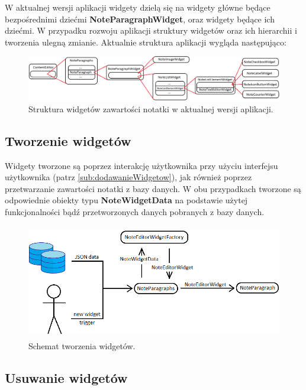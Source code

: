 W aktualnej wersji aplikacji widgety dzielą się na widgety główne będące bezpośrednimi dziećmi \textbf{NoteParagraphWidget}, oraz widgety będące ich dziećmi. W przypadku rozwoju aplikacji struktury widgetów oraz ich hierarchii i tworzenia ulegną zmianie. Aktualnie struktura aplikacji wygląda następująco:

\begin{figure}[ht]
    \centering
    \includegraphics[width=\linewidth]{images/struktura_widgetow_w_notatce.png}
    \caption{Struktura widgetów zawartości notatki w aktualnej wersji aplikacji.}
    \label{fig:struktura-widgetow}
\end{figure}

\subsection{Tworzenie widgetów}

Widgety tworzone są poprzez interakcję użytkownika przy użyciu interfejsu użytkownika (patrz \ref{sub:dodawanieWidgetow}), jak również poprzez przetwarzanie zawartości notatki z bazy danych. W obu przypadkach tworzone są odpowiednie obiekty typu \textbf{NoteWidgetData} na podstawie użytej funkcjonalności bądź przetworzonych danych pobranych z bazy danych.

\begin{figure}[ht]
    \centering
    \includegraphics[height=5cm]{images/tworzenie_widgetow.png}
    \caption{Schemat tworzenia widgetów.}
    \label{fig:create-widget}
\end{figure}

\subsection{Usuwanie widgetów}

